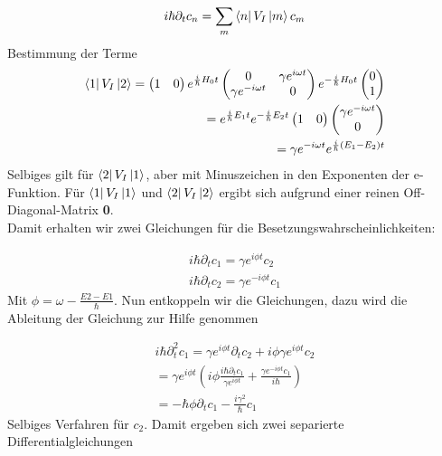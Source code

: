 \begin{align}
i \hbar \partial_t c_n = \sum_m \Bra{n} V_I \Ket{m} c_m
\end{align}
Bestimmung der Terme
\begin{align}
\Bra{1} V_I \Ket{2} = 
\begin{pmatrix}
1 & 0
\end{pmatrix}
e^{\frac{i}{\hbar}H_0 t}
\begin{pmatrix}
0 & \gamma e^{i \omega t} \\ \gamma e^{-i \omega t} & 0
\end{pmatrix}
e^{-\frac{i}{\hbar}H_0 t}
\begin{pmatrix}
0 \\ 1
\end{pmatrix}
\\
= e^{\frac{i}{\hbar}E_1 t} e^{-\frac{i}{\hbar}E_2 t}
\begin{pmatrix}
1 & 0
\end{pmatrix}
\begin{pmatrix}
\gamma e^{-i \omega t} \\ 0
\end{pmatrix}
\\
= \gamma e^{-i \omega t} e^{\frac{i}{\hbar}\left(E_1-E_2\right) t}
\end{align}
Selbiges gilt f\"ur $\Bra{2} V_I \Ket{1}$, aber mit Minuszeichen in den Exponenten der e-Funktion. F\"ur $\Bra{1} V_I \Ket{1}$ und $\Bra{2} V_I \Ket{2}$ ergibt sich aufgrund einer reinen Off-Diagonal-Matrix \textbf{0}.\\
Damit erhalten wir zwei Gleichungen f\"ur die Besetzungswahrscheinlichkeiten:

\begin{align}
i \hbar \partial_t c_1 = \gamma e^{i \phi t} c_2 \\
i \hbar \partial_t c_2 = \gamma e^{-i \phi t} c_1
\end{align}
Mit $\phi = \omega - \frac{E2-E1}{\hbar}$. Nun entkoppeln wir die Gleichungen, dazu wird die Ableitung der Gleichung zur Hilfe genommen

\begin{align}
i \hbar \partial_t^2 c_1 = \gamma e^{i \phi t} \partial_t c_2 + i \phi \gamma e^{i \phi t}  c_2 \\
= \gamma e^{i \phi t} \left( i \phi \frac{i \hbar \partial_t c_1}{\gamma e^{i \phi t}} + \frac{\gamma e^{-i \phi t} c_1}{i \hbar} \right) \\
= - \hbar \phi \partial_t c_1 - \frac{i \gamma^2}{\hbar} c_1
\end{align}
Selbiges Verfahren f\"ur $c_2$. Damit ergeben sich zwei separierte Differentialgleichungen

